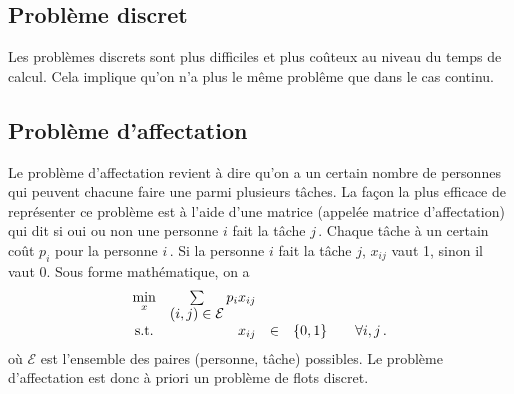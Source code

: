 \subsection{Problème discret}

	Les problèmes discrets sont plus difficiles et plus coûteux
	au niveau du temps de calcul.
	Cela implique qu'on n'a plus le même problême que dans le cas continu.

\subsection{Problème d'affectation}
\label{sec:affectation}

	\begin{center}
	\end{center}

	Le problème d'affectation revient à dire
	qu'on a un certain nombre de personnes
	qui peuvent chacune faire une parmi plusieurs tâches.
	La façon la plus efficace de représenter ce problème
	est à l'aide d'une matrice (appelée matrice d'affectation)
	qui dit si oui ou non une personne $i$
	fait la tâche $j\,$.
	Chaque tâche à un certain coût $p_i$ pour la personne $i\,$.
	Si la personne $i$ fait la tâche $j$, $x_{ij}$ vaut 1,
	sinon il vaut 0.
	Sous forme mathématique, on a
	\begin{equation*}
	\begin{array}{c@{\quad} r c l@{\qquad} l}
		\min\limits_{x} & \sum\limits_{{\displaystyle (i,j) \in \mathcal{E}}} p_i x_{ij} &&&\\
		\textnormal{s.t.} & x_{ij} & \in & \{0, 1\} & \forall i,j\,.
	\end{array}
	\end{equation*}
	où $\mathcal{E}$ est l'ensemble
	des paires (personne, tâche) possibles.
	Le problème d'affectation est donc à priori
	un problème de flots discret.

